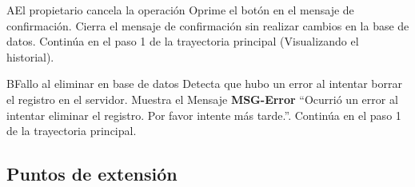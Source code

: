 
\begin{UCtrayectoriaA}{A}{El propietario cancela la operación}
    \UCpaso[\UCactor] Oprime el botón  en el mensaje de confirmación.
    \UCpaso Cierra el mensaje de confirmación sin realizar cambios en la base de datos.
    \UCpaso Continúa en el paso 1 de la trayectoria principal (Visualizando el historial).
\end{UCtrayectoriaA}

\begin{UCtrayectoriaA}{B}{Fallo al eliminar en base de datos}
    \UCpaso Detecta que hubo un error al intentar borrar el registro en el servidor.
    \UCpaso Muestra el Mensaje {\bf MSG-Error} ``Ocurrió un error al intentar eliminar el registro. Por favor intente más tarde.''.
    \UCpaso Continúa en el paso 1 de la trayectoria principal.
\end{UCtrayectoriaA}

\subsection{Puntos de extensión}

